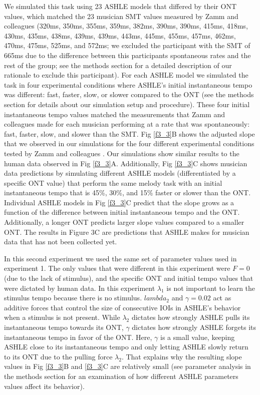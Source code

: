 \documentclass{report}
\begin{document}
We simulated this task using 23 ASHLE models that differed by their ONT values, which matched the 23 musician SMT values measured by Zamm and colleagues \cite{zamm2018musicians} (320ms, 350ms, 355ms, 359ms, 382ms, 390ms, 390ms, 415ms, 418ms, 430ms, 435ms, 438ms, 439ms, 439ms, 443ms, 445ms, 455ms, 457ms, 462ms, 470ms, 475ms, 525ms, and 572ms; we excluded the participant with the SMT of 665ms due to the difference between this participants spontaneous rates and the rest of the group; see the methods section for a detailed description of our rationale to exclude this participant). For each ASHLE model we simulated the task in four experimental conditions where ASHLE's initial instantaneous tempo was different: fast, faster, slow, or slower compared to the ONT (see the methods section for details about our simulation setup and procedure). These four initial instantaneous tempo values matched the measurements that Zamm and colleagues \cite{zamm2018musicians} made for each musician performing at a rate that was spontaneously: fast, faster, slow, and slower than the SMT. Fig \ref{f3_3}B shows the adjusted slope that we observed in our simulations for the four different experimental conditions tested by Zamm and colleagues \cite{zamm2018musicians}. Our simulations show similar results to the human data observed in Fig \ref{f3_3}A. Additionally, Fig \ref{f3_3}C shows musician data predictions by simulating different ASHLE models (differentiated by a specific ONT value) that perform the same melody task with an initial instantaneous tempo that is 45\%, 30\%, and 15\% faster or slower than the ONT. Individual ASHLE models in Fig \ref{f3_3}C predict that the slope grows as a function of the difference between initial instantaneous tempo and the ONT. Additionally, a longer ONT predicts larger slope values compared to a smaller ONT. The results in Figure 3C are predictions that ASHLE makes for musician data that has not been collected yet.

In this second experiment we used the same set of parameter values used in experiment 1. The only values that were different in this experiment were $F = 0$ (due to the lack of stimulus), and the specific ONT and initial tempo values that were dictated by human data. In this experiment $\lambda_1$ is not important to learn the stimulus tempo because there is no stimulus. $lambda_2$ and $\gamma = 0.02$ act as additive forces that control the size of consecutive IOIs in ASHLE's behavior when a stimulus is not present. While $\lambda_2$ dictates how strongly ASHLE pulls its instantaneous tempo towards its ONT, $\gamma$ dictates how strongly ASHLE forgets its instantaneous tempo in favor of the ONT. Here, $\gamma$ is a small value, keeping ASHLE close to its instantaneous tempo and only letting ASHLE slowly return to its ONT due to the pulling force $\lambda_2$. That explains why the resulting slope values in Fig \ref{f3_3}B and \ref{f3_3}C are relatively small (see parameter analysis in the methods section for an examination of how different ASHLE parameters values affect its behavior).
\end{document}
